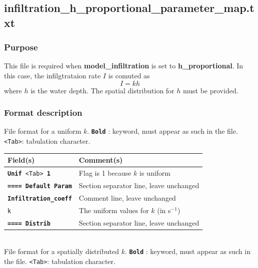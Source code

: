 \subsection{infiltration\_h\_proportional\_parameter\_map.txt}
\subsubsection{Purpose}
This file is required when \textbf{model\_infiltration} is set to \textbf{h\_proportional}. In this case, the infilgtrataion rate $I$ is comuted as
\begin{equation}
I = k h
\end{equation} where $h$ is the water depth. The spatial distribution for $h$ must be provided.
%
\subsubsection{Format description}
File format for a uniform $k$.  
\texttt{\textbf{Bold}} : keyword, must appear as such in the file. \texttt{<Tab>}: tabulation character. \\
    \begin{tabular}{p{6cm} | p{9cm}}
    \hline
    Field(s) & Comment(s) \\
    \hline  \hline
    \texttt{\textbf{Unif} <Tab> \textbf{1}} & Flag is 1 because $k$ is uniform \\ 
    \hline
    \texttt{\textbf{==== Default Param}} & Section separator line, leave unchanged \\
    \hline
    \texttt{\textbf{Infiltration\_coeff}} & Comment line, leave unchanged \\  
    \hline
    \texttt{k} & The uniform values for $k$ (in s$^{-1}$) \\ 
    \hline
    \texttt{\textbf{==== Distrib}} & Section separator line, leave unchanged \\  
    \hline
    \end{tabular}
%
\vspace{10mm} \\
%
File format for a spatially distributed $k$.  
\texttt{\textbf{Bold}} : keyword, must appear as such in the file. \texttt{<Tab>}: tabulation character. \\
